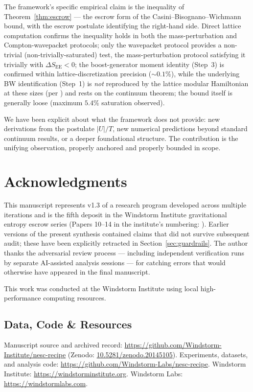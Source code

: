 \documentclass[11pt]{article}
\begin{document}
The framework's specific empirical claim is the inequality of Theorem~\ref{thm:escrow} — the escrow form of the Casini--Bisognano--Wichmann bound, with the escrow postulate identifying the right-hand side. Direct lattice computation confirms the inequality holds in both the mass-perturbation and Compton-wavepacket protocols; only the wavepacket protocol provides a non-trivial (non-trivially-saturated) test, the mass-perturbation protocol satisfying it trivially with $\Delta S_{\mathrm{EE}}<0$; the boost-generator moment identity (Step~3) is confirmed within lattice-discretization precision ($\sim 0.1\%$), while the underlying BW identification (Step~1) is \emph{not} reproduced by the lattice modular Hamiltonian at these sizes (per \cite{Whitmer2026Lattice}) and rests on the continuum theorem; the bound itself is generally loose (maximum $5.4\%$ saturation observed).

We have been explicit about what the framework does not provide: new derivations from the postulate $|U|/T$, new numerical predictions beyond standard continuum results, or a deeper foundational structure. The contribution is the unifying observation, properly anchored and properly bounded in scope.

\section*{Acknowledgments}

This manuscript represents v1.3 of a research program developed across multiple iterations and is the fifth deposit in the Windstorm Institute gravitational entropy escrow series (Papers 10--14 in the institute's numbering: \cite{Whitmer2026Phonon, Whitmer2026Escrow, Whitmer2026C8, Whitmer2026Lattice, Whitmer2026Translation}). Earlier versions of the present synthesis contained claims that did not survive subsequent audit; these have been explicitly retracted in Section~\ref{sec:guardrails}. The author thanks the adversarial review process — including independent verification runs by separate AI-assisted analysis sessions — for catching errors that would otherwise have appeared in the final manuscript.

This work was conducted at the Windstorm Institute using local high-performance computing resources.

\subsection*{Data, Code \& Resources}
\noindent Manuscript source and archived record: \url{https://github.com/Windstorm-Institute/nesc-recipe} (Zenodo: \href{https://doi.org/10.5281/zenodo.20145105}{10.5281/zenodo.20145105}). Experiments, datasets, and analysis code: \url{https://github.com/Windstorm-Labs/nesc-recipe}. Windstorm Institute: \url{https://windstorminstitute.org}. Windstorm Labs: \url{https://windstormlabs.com}.
\end{document}
